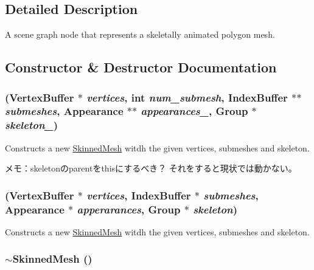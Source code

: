 \subsection{Detailed Description}
A scene graph node that represents a skeletally animated polygon mesh. 

\subsection{Constructor \& Destructor Documentation}
\hypertarget{classm3g_1_1SkinnedMesh_277419d6851b0e305f66a46095269915}{
\subsubsection[{SkinnedMesh}]{ ({\bf VertexBuffer} $\ast$ {\em vertices}, \/  int {\em num\_\-submesh}, \/  {\bf IndexBuffer} $\ast$$\ast$ {\em submeshes}, \/  {\bf Appearance} $\ast$$\ast$ {\em appearances\_\-}, \/  Group $\ast$ {\em skeleton\_\-})}}
\label{classm3g_1_1SkinnedMesh_277419d6851b0e305f66a46095269915}


Constructs a new \hyperlink{classm3g_1_1SkinnedMesh}{SkinnedMesh} witdh the given vertices, submeshes and skeleton.

メモ：skeletonのparentをthisにするべき？ それをすると現状では動かない。 \hypertarget{classm3g_1_1SkinnedMesh_094bf88089897beeb8b8776e3bbb299d}{
\subsubsection[{SkinnedMesh}]{ ({\bf VertexBuffer} $\ast$ {\em vertices}, \/  {\bf IndexBuffer} $\ast$ {\em submeshes}, \/  {\bf Appearance} $\ast$ {\em apperarances}, \/  Group $\ast$ {\em skeleton})}}
\label{classm3g_1_1SkinnedMesh_094bf88089897beeb8b8776e3bbb299d}


Constructs a new \hyperlink{classm3g_1_1SkinnedMesh}{SkinnedMesh} witdh the given vertices, submeshes and skeleton. \hypertarget{classm3g_1_1SkinnedMesh_c73da5b5c5f8f14fc241328b4b78928c}{
\subsubsection[{$\sim$SkinnedMesh}]{\setlength{\rightskip}{0pt plus 5cm}$\sim${\bf SkinnedMesh} ()}}
\label{classm3g_1_1SkinnedMesh_c73da5b5c5f8f14fc241328b4b78928c}


